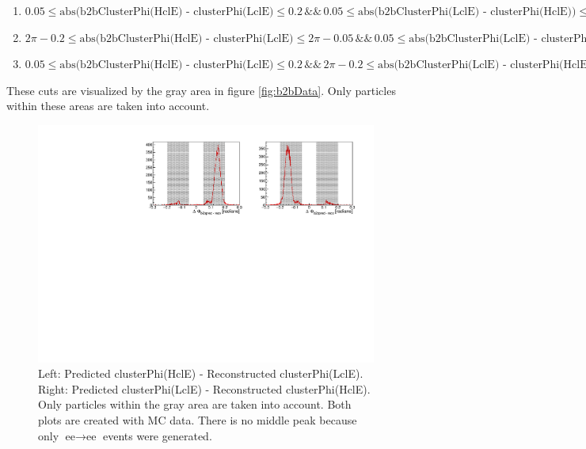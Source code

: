 \documentclass[a4paper,11pt,twosided,final,german,openbib,pdftex,listof=totoc,bibliography=totoc]{scrbook}
\begin{document}
\begin{enumerate}[label=(\alph*)]
	\item $0.05 \leq \textrm{abs(b2bClusterPhi(HclE) - clusterPhi(LclE)} \leq 0.2 \, \&\& \, 0.05 \leq \textrm{abs(b2bClusterPhi(LclE) - clusterPhi(HclE))} \leq 0.2$
	\item $2\pi - 0.2 \leq \textrm{abs(b2bClusterPhi(HclE) - clusterPhi(LclE)} \leq 2\pi - 0.05 \, \&\& \, 0.05 \leq \textrm{abs(b2bClusterPhi(LclE) - clusterPhi(HclE))} \leq 0.2$
	\item $0.05 \leq \textrm{abs(b2bClusterPhi(HclE) - clusterPhi(LclE)} \leq 0.2 \, \&\& \, 2\pi - 0.2 \leq \textrm{abs(b2bClusterPhi(LclE) - clusterPhi(HclE))} \leq 2\pi - 0.05$
\end{enumerate}

These cuts are visualized by the gray area in figure \ref{fig:b2bData}. Only particles within these areas are taken into account.




\begin{figure}[h!]
	\centering
	\includegraphics[width=\textwidth]{Plots/master/sb2b_MC.pdf}
	\caption[b2bClusterPhi - clusterPhi For MC]{Left: Predicted clusterPhi(HclE) - Reconstructed clusterPhi(LclE). Right: Predicted clusterPhi(LclE) - Reconstructed clusterPhi(HclE). Only particles within the gray area are taken into account. Both plots are created with MC data. There is no middle peak because only $\textrm{ee} \rightarrow \textrm{ee}$ events were generated.}
	\label{fig:b2bMC}
\end{figure}
\end{document}

